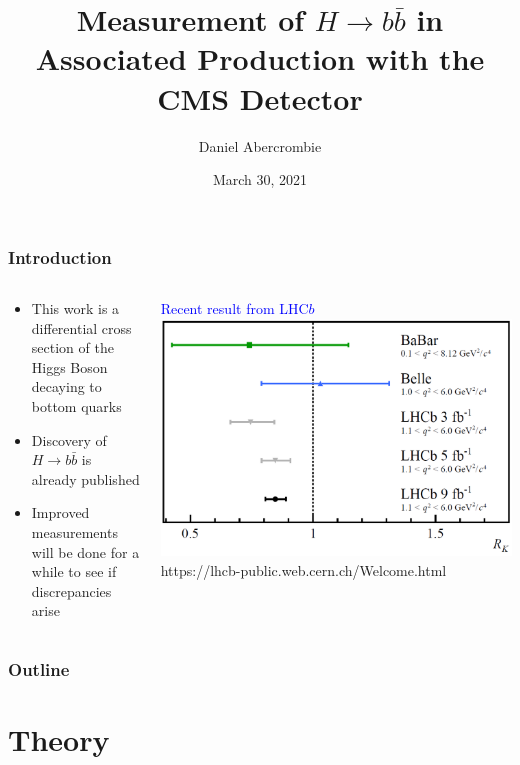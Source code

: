 \documentclass{beamer}
\author[D. Abercrombie]{
  Daniel Abercrombie
}
\title{\bf \sffamily Measurement of $H\rightarrow b\bar{b}$ in \\ Associated Production with the CMS Detector}
\date{March 30, 2021}
\begin{document}
\begin{frame}
  \titlepage
\end{frame}

\begin{frame}
  \frametitle{Introduction}

  \begin{columns}
    \begin{column}{0.5\linewidth}
      \begin{itemize}
      \item This work is a differential cross section of the Higgs Boson decaying to bottom quarks
      \item Discovery of $H \rightarrow b\bar{b}$ is already published
      \item Improved measurements will be done for a while to see if discrepancies arise
      \end{itemize}
    \end{column}
    \begin{column}{0.5\linewidth}
      \centering
      \textcolor{blue}{Recent result from LHC$b$}
      \includegraphics[width=\linewidth]{figures/RK2021.png}
      \tiny{https://lhcb-public.web.cern.ch/Welcome.html}
    \end{column}
  \end{columns}

\end{frame}

\begin{frame}
  \frametitle{Outline}
  \tableofcontents
\end{frame}

\section{Theory}
\end{document}
